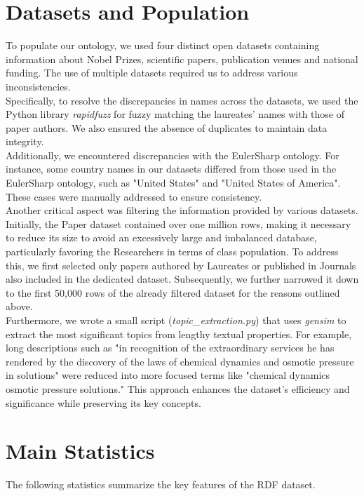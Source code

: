 \documentclass{article}
\begin{document}
\section*{Datasets and Population}
To populate our ontology, we used four distinct open datasets containing information about Nobel Prizes, scientific papers, publication venues and
national funding. The use of multiple datasets required us to address various inconsistencies. \\
Specifically, to resolve the discrepancies in names across the datasets,
we used the Python library \textit{rapidfuzz} for fuzzy matching the laureates' names with those of paper authors. We also ensured the absence of duplicates to
maintain data integrity. \\
Additionally, we encountered discrepancies with the EulerSharp ontology.
For instance, some country names in our datasets differed from those used in the EulerSharp ontology, such as "United
States" and "United States of America". These cases were manually addressed to ensure consistency. \\
Another critical aspect was filtering the information provided by various datasets. Initially, the Paper dataset contained 
over one million rows, making it necessary to reduce its size to avoid an excessively large and imbalanced 
database, particularly favoring the Researchers in terms of class population. To address this, we first selected 
only papers authored by Laureates or published in Journals also included in the dedicated dataset. 
Subsequently, we further narrowed it down to the first 50,000 rows of the already filtered dataset 
for the reasons outlined above.\\
Furthermore, we wrote a small script (\textit{topic\_extraction.py}) that uses \textit{gensim} to extract the most significant topics from lengthy textual properties.
For example, long descriptions such as "in recognition of the extraordinary services he has rendered by the
discovery of the laws of chemical dynamics and osmotic pressure in solutions" were reduced into more focused terms like "chemical dynamics osmotic
pressure solutions." This approach enhances the dataset's efficiency and significance while preserving its key concepts.

\section*{Main Statistics}

The following statistics summarize the key features of the RDF dataset.
\end{document}
